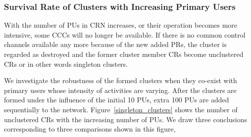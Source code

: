 \documentclass[10pt,journal,compsoc]{IEEEtran}
\theoremstyle{mytheoremstyle}
\theoremstyle{mytheoremstyle}
\theoremstyle{mytheoremstyle}
\newcommand{\ie}{i.e., }
\begin{document}
\subsubsection{Survival Rate of Clusters with Increasing Primary Users}
With the number of PUs in CRN increases, or their operation becomes more intensive, some CCCs will no longer be available.
If there is no common control channels available any more because of the new added PRs, the cluster is regarded as destroyed and the former cluster member CRs become unclustered CRs or in other words singleton clusters.

We investigate the robustness of the formed clusters when they co-exist with primary users whose intensity of activities are varying.
After the clusters are formed under the influence of the initial 10 PUs, extra 100 PUs are added sequentially to the network.
Figure~\ref{singleton_clusters} shows the number of unclustered CRs with the increasing number of PUs.%
%
We draw three conclusions corresponding to three comparisons shown in this figure,
\end{document}
